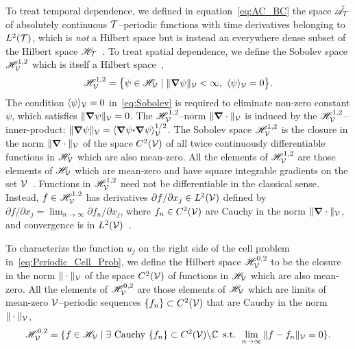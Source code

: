 \documentclass[amsa]{ipart}
\begin{document}
To treat temporal dependence, we defined in equation~\eqref{eq:AC_BC} 
the space $\tilde{\mathscr{A}}_{\mathcal{T}}$ of 
absolutely continuous $\mathcal{T}$--periodic functions with time derivatives
belonging to $L^2(\mathcal{T})$, which is \emph{not} a Hilbert space but is
instead an everywhere dense subset of the Hilbert space
$\mathscr{H}_{\mathcal{T}}$~\cite{Stone:64}. To treat spatial dependence, we define 
the Sobolev space $\mathscr{H}^{1,2}_{\mathcal{V}}$ which is itself a Hilbert
space~\cite{Bhattacharya:AAP:1999:951,Folland:95:PDEs,McOwen:2003:PDE},             
% 
\begin{align}\label{eq:Sobolev}
  \Hs^{1,2}_{\Vc}=\big\{\psi\in \Hs_{\Vc} \; | \; \|\bnabla\psi\|_{\Vc}<\infty, \ \langle\psi\rangle_{\Vc}=0\big\}.
\end{align}
%
The condition $\langle\psi\rangle_{\mathcal{V}}=0$ in~\eqref{eq:Sobolev} is required to
eliminate non-zero constant $\psi$, which satisfies
$\|\mbox{\boldmath${\nabla}$}\psi\|_{\mathcal{V}}=0$. The $\mathscr{H}^{1,2}_{\mathcal{V}}$--norm $\|\mbox{\boldmath${\nabla}$}\cdot\|_{\mathcal{V}}$
is induced by the $\mathscr{H}^{1,2}_{\mathcal{V}}$--inner-product:
$\|\mbox{\boldmath${\nabla}$}\psi\|_{\mathcal{V}}=\langle\mbox{\boldmath${\nabla}$}\psi\mbox{\boldmath${\cdot}$}\mbox{\boldmath${\nabla}$}\psi\rangle_{\mathcal{V}}^{1/2}$. The Sobolev
space $\mathscr{H}^{1,2}_{\mathcal{V}}$ is the closure in the norm $\|\mbox{\boldmath${\nabla}$}\cdot\|_{\mathcal{V}}$
of the space $C^2(\mathcal{V})$ of all twice continuously differentiable
functions in $\mathscr{H}_{\mathcal{V}}$ which are also mean-zero. All the elements of
$\mathscr{H}^{1,2}_{\mathcal{V}}$ are those elements of $\mathscr{H}_{\mathcal{V}}$ which are
mean-zero and have square integrable gradients on the set 
$\mathcal{V}$~\cite{Bhattacharya:AAP:1999:951}. Functions in $\mathscr{H}^{1,2}_{\mathcal{V}}$
need not be differentiable in the classical 
sense. Instead, $f\in\mathscr{H}^{1,2}_{\mathcal{V}}$ has derivatives $\partial f/\partial x_j\in
L^2(\mathcal{V})$ defined by $\partial f/\partial x_j=\lim_{n\to\infty}\partial f_n/\partial x_j$, where $f_n\in
C^2(\mathcal{V})$ are Cauchy in the norm $\|\mbox{\boldmath${\nabla}$}\cdot\|_{\mathcal{V}}$, and convergence is
in $L^2(\mathcal{V})$~\cite{McOwen:2003:PDE}.


To characterize the function $u_j$ on the right
side of the cell problem in~\eqref{eq:Periodic_Cell_Prob}, we define
the Hilbert space $\mathscr{H}^{0,2}_{\mathcal{V}}$ to be the closure in the norm
$\|\cdot\|_{\mathcal{V}}$ of the space $C^2(\mathcal{V})$ of functions in $\mathscr{H}_{\mathcal{V}}$ which
are also mean-zero. All the elements of
$\mathscr{H}^{0,2}_{\mathcal{V}}$ are those elements of $\mathscr{H}_{\mathcal{V}}$ which are limits of
mean-zero $\mathcal{V}$--periodic sequences $\{f_n\}\subset C^2(\mathcal{V})$ that are Cauchy   
in the norm $\|\cdot\|_{\mathcal{V}}$,
%
\begin{align}
  \Hs^{0,2}_{\Vc}=\{f\in\Hs_{\Vc} \;|\; \exists \text{ Cauchy }
  \{f_n\}\subset C^2(\Vc)\backslash\mathbb{C} \,\text{ s.t. } \lim_{n\to\infty}\|f-f_n\|_{\Vc}=0\}.   
\end{align}
%
\end{document}
